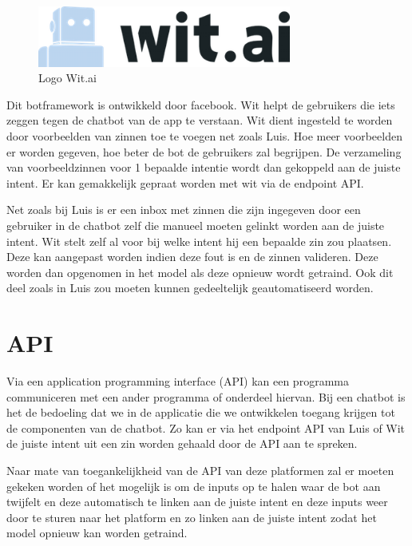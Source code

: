 \begin{figure}[h!]
	\centering
	\includegraphics[height=2cm]{wit.png}
	\caption{Logo Wit.ai ~\autocite{Eva2016}}
	\label{fig:wit}
\end{figure}

Dit botframework is ontwikkeld door facebook. Wit helpt de gebruikers die iets zeggen tegen de chatbot van de app te verstaan. Wit dient ingesteld te worden door voorbeelden van zinnen toe te voegen net zoals Luis. Hoe meer voorbeelden er worden gegeven, hoe beter de bot de gebruikers zal begrijpen. De verzameling van voorbeeldzinnen voor 1 bepaalde intentie wordt dan gekoppeld aan de juiste intent. Er kan gemakkelijk gepraat worden met wit via de endpoint API. 

Net zoals bij Luis is er een inbox met zinnen die zijn ingegeven door een gebruiker in de chatbot zelf die manueel moeten gelinkt worden aan de juiste intent. Wit stelt zelf al voor bij welke intent hij een bepaalde zin zou plaatsen. Deze kan aangepast worden indien deze fout is en de zinnen valideren. Deze worden dan opgenomen in het model als deze opnieuw wordt getraind. Ook dit deel zoals in Luis zou moeten kunnen gedeeltelijk geautomatiseerd worden. ~\autocite{Wit2019}

\section{API}
\label{sec:API}

Via een application programming interface (API) kan een programma communiceren met een ander programma of onderdeel hiervan. Bij een chatbot is het de bedoeling dat we in de applicatie die we ontwikkelen toegang krijgen tot de componenten van de chatbot. Zo kan er via het endpoint API van Luis of Wit de juiste intent uit een zin worden gehaald door de API aan te spreken. 

Naar mate van toegankelijkheid van de API van deze platformen zal er moeten gekeken worden of het mogelijk is om de inputs op te halen waar de bot aan twijfelt en deze automatisch te linken aan de juiste intent en deze inputs weer door te sturen naar het platform en zo linken aan de juiste intent zodat het model opnieuw kan worden getraind. ~\autocite{Kristian2011}     



